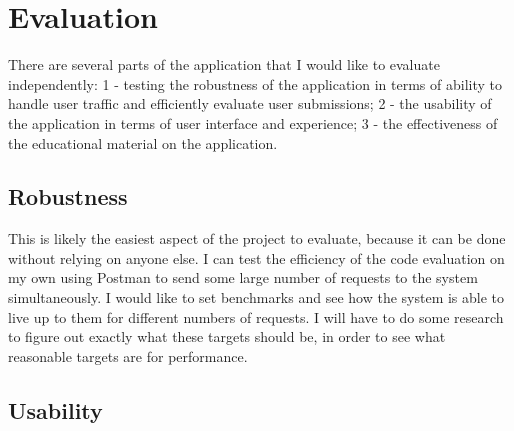\documentclass[10pt,twocolumn]{article}
\begin{document}


\section{Evaluation}



There are several parts of the application that I would like to evaluate independently: 1 - testing the robustness of 
the application in terms of ability to handle user traffic and efficiently evaluate user submissions; 2 - the usability 
of the application in terms of user interface and experience; 3 - the effectiveness of the educational material on the 
application.

\subsection{Robustness}

This is likely the easiest aspect of the project to evaluate, because it can be done without relying on anyone else. I 
can test the efficiency of the code evaluation on my own using Postman to send some large number of requests to the 
system simultaneously. I would like to set benchmarks and see how the system is able to live up to them for different 
numbers of requests. I will have to do some research to figure out exactly what these targets should be, in order to see
what reasonable targets are for performance.

\subsection{Usability}
\end{document}
